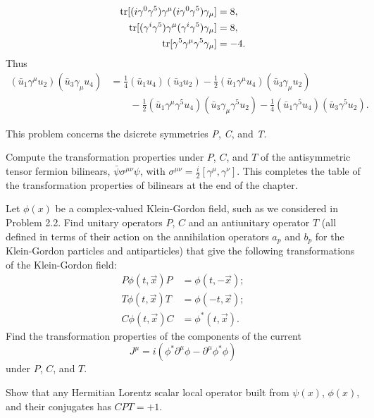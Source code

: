 \begin{problembody}
\begin{align*}
        \operatorname{tr}[(i\gamma^0\gamma^5)\gamma^\mu(i\gamma^0\gamma^5)\gamma_\mu] & = 8,\\
        \operatorname{tr}[(\gamma^i\gamma^5)\gamma^\mu(\gamma^i\gamma^5)\gamma_\mu] & = 8,\\
        \operatorname{tr}[\gamma^5\gamma^\mu\gamma^5\gamma_\mu] & = -4.
    \end{align*}
    Thus
    \begin{align*}
        (\bar{u}_1\gamma^\mu u_2)(\bar{u}_3\gamma_\mu u_4) & = 
        \frac{1}{4}(\bar{u}_1u_4)(\bar{u}_3u_2)
        - \frac{1}{2}(\bar{u}_1\gamma^\mu u_4)(\bar{u}_3\gamma_\mu u_2)\\
        & \qquad - \frac{1}{2}(\bar{u}_1\gamma^\mu\gamma^5u_4)(\bar{u}_3\gamma_\mu\gamma^5u_2)
        - \frac{1}{4}(\bar{u}_1\gamma^5u_4)(\bar{u}_3\gamma^5u_2).
    \end{align*}
\end{problembody}

\problem This problem concerns the dsicrete symmetries \textit{P}, \textit{C}, and \textit{T}.
\begin{problembody}
    \item Compute the transformation properties under $P$, $C$, and $T$ of the antisymmetric
    tensor fermion bilinears, $\bar{\psi}\sigma^{\mu\nu}\psi$, with $\sigma^{\mu\nu} = \frac{i}{2}[\gamma^\mu, \gamma^\nu]$.
    This completes the table of the transformation properties of bilinears at the end of the chapter.

    \item Let $\phi(x)$ be a complex-valued Klein-Gordon field, such as we considered in Problem 2.2.
    Find unitary operators $P$, $C$ and an antiunitary operator $T$ (all defined in terms of their action
    on the annihilation operators $a_p$ and $b_p$ for the Klein-Gordon particles and antiparticles) that
    give the following transformations of the Klein-Gordon field:
    \begin{align*}
        P\phi(t, \vec{x})P & = \phi(t, -\vec{x});\\
        T\phi(t, \vec{x})T & = \phi(-t, \vec{x});\\
        C\phi(t, \vec{x})C & = \phi^\ast(t, \vec{x}).
    \end{align*}
    Find the transformation properties of the components of the current
    \begin{equation*}
        J^\mu = i(\phi^\ast\partial^\mu\phi - \partial^\mu\phi^\ast\phi)
    \end{equation*}
    under $P$, $C$, and $T$.

    \item Show that any Hermitian Lorentz scalar local operator built from $\psi(x)$, $\phi(x)$, and their conjugates
    has $CPT = +1$.
\end{problembody}

